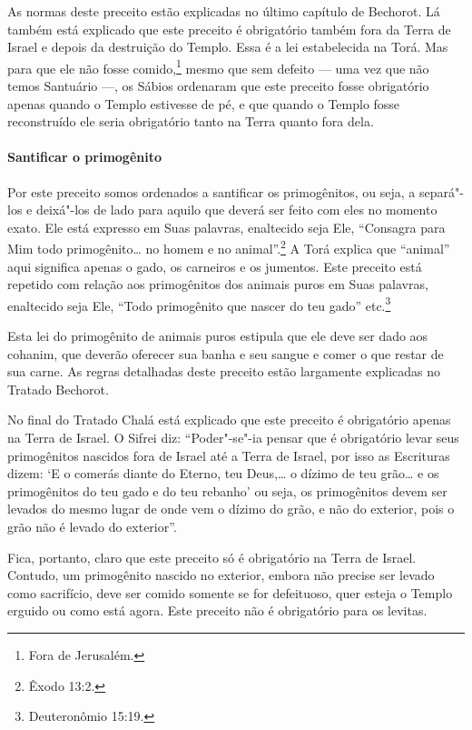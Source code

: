 \begin{multicols}{2}
As normas deste preceito estão explicadas no último capítulo de Bechorot\starr. Lá também está explicado que este preceito é obrigatório também
fora da Terra de Israel e depois da destruição do Templo. Essa é a lei
estabelecida na Torá\starr. Mas para que ele não fosse comido,\footnote{Fora de Jerusalém.} mesmo
que sem defeito ---
uma vez que não temos Santuário ---, os Sábios ordenaram que este
preceito fosse obrigatório apenas quando o Templo estivesse de pé, e que quando o
Templo fosse reconstruído ele seria obrigatório tanto na Terra quanto
fora dela.

\paragraph{Santificar o primogênito}

Por este preceito somos ordenados a santificar os primogênitos, ou seja,
a separá"-los e deixá"-los de lado para aquilo que deverá ser feito com
eles no momento exato. Ele está expresso em Suas palavras, enaltecido
seja Ele, ``Consagra para Mim todo primogênito\ldots{} no homem e no
animal''.\footnote{Êxodo 13:2.} A Torá\starr{} explica que ``animal'' aqui significa
apenas o gado, os carneiros e os jumentos. Este preceito está repetido
com relação aos primogênitos dos animais puros em Suas palavras,
enaltecido seja Ele, ``Todo primogênito que nascer do teu gado'' etc.\footnote{Deuteronômio 15:19.}

Esta lei do primogênito de animais puros estipula que ele deve ser dado
aos cohanim\starr, que deverão oferecer sua banha e seu sangue e comer
o que restar de sua carne. As regras detalhadas deste preceito estão
largamente explicadas no Tratado Bechorot\starr.

No final do Tratado Chalá\starr{} está explicado que este preceito é obrigatório
apenas na Terra de Israel. O Sifrei\starr{} diz: ``Poder"-se"-ia pensar que é
obrigatório levar seus primogênitos nascidos fora de Israel até a Terra
de Israel, por isso as Escrituras dizem: `E o comerás diante do Eterno,
teu Deus,\ldots{} o dízimo de teu grão\ldots{} e os primogênitos do teu gado e do 
teu rebanho' ou seja, os primogênitos devem ser levados do mesmo lugar
de onde vem o dízimo do grão, e não do exterior, pois o grão não é
levado do exterior''.

Fica, portanto, claro que este preceito só é obrigatório na Terra de
Israel. Contudo, um primogênito nascido no exterior, embora não precise
ser levado como sacrifício, deve ser comido somente se for defeituoso,
quer esteja o Templo erguido ou como está agora. Este preceito não é
obrigatório para os levitas\starr.


\end{multicols}
